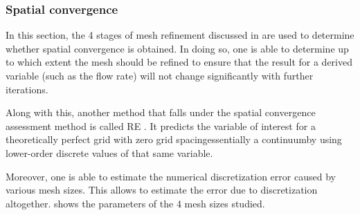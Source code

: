 \subsubsection{Spatial convergence}
\label{sec:validation:spatial_convergence}

In this section, the 4 stages of mesh refinement discussed in  are used to determine whether spatial convergence is obtained.
In doing so, one is able to determine up to which extent the mesh should be refined to ensure that  the result for a derived variable (such as the flow rate) will not change significantly with further iterations.

Along with this, another method that falls under the spatial convergence assessment method is called \gls{RE} \citep{Slater2008}. 
It predicts the variable of interest for a theoretically perfect grid with zero grid spacing\textemdash essentially a continuum\textemdash by using lower-order discrete values of that same variable.

Moreover, one is able to estimate the numerical discretization error caused by various mesh sizes. 
This allows to estimate the error due to discretization altogether. 
 shows the parameters of the 4 mesh sizes studied. 




